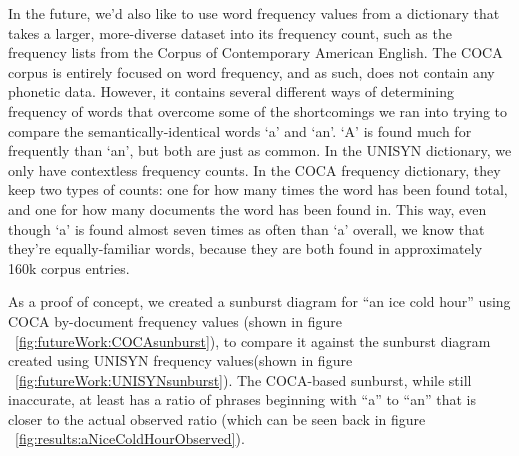 In the future, we'd also like to use word frequency values from a dictionary that takes a larger, more-diverse dataset into its frequency count, such as the frequency lists from the Corpus of Contemporary American English\cite{freeFreqList}.  The COCA corpus is entirely focused on word frequency, and as such, does not contain any phonetic data.  However, it contains several different ways of determining frequency of words that overcome some of the shortcomings we ran into trying to compare the semantically-identical words `a' and `an'.  `A' is found much for frequently than `an', but both are just as common.  In the UNISYN dictionary, we only have contextless frequency counts.  In the COCA frequency dictionary, they keep two types of counts: one for how many times the word has been found total, and one for how many documents the word has been found in.  This way, even though `a' is found almost seven times as often than `a' overall, we know that they're equally-familiar words, because they are both found in approximately 160k corpus entries\cite{davies_word_2011}.

As a proof of concept, we created a sunburst diagram for ``an ice cold hour'' using COCA by-document frequency values (shown in figure ~\ref{fig:futureWork:COCAsunburst}), to compare it against the sunburst diagram created using UNISYN frequency values(shown in figure ~\ref{fig:futureWork:UNISYNsunburst}).  The COCA-based sunburst, while still inaccurate, at least has a ratio of phrases beginning with ``a'' to ``an'' that is closer to the actual observed ratio (which can be seen back in figure ~\ref{fig:results:aNiceColdHourObserved}).



